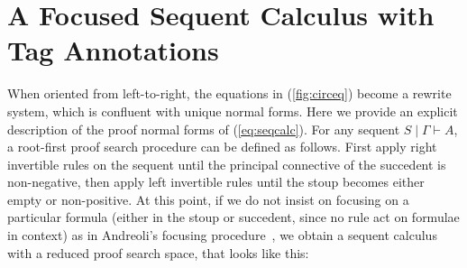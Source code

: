 \documentclass[submission,copyright,creativecommons]{eptcs}
\theoremstyle{definition}
\begin{document}
\section{A Focused Sequent Calculus with Tag Annotations}\label{sec:focusing}
When oriented from left-to-right, the equations in (\ref{fig:circeq}) become a  rewrite system, which is confluent with unique normal forms. Here we provide an explicit description of the proof normal forms of (\ref{eq:seqcalc}).
For any sequent $S \mid \Gamma \vdash A$, a root-first proof search procedure can be defined as follows. First apply right invertible rules on the sequent until the principal connective of the succedent is non-negative, then apply left invertible rules until the stoup becomes either empty or non-positive. At this point, if we do not insist on focusing on a particular formula (either in the stoup or succedent, since no rule act on formulae in context) as in Andreoli's focusing procedure~\cite{andreoli:logic:1992}, we obtain a sequent calculus with a reduced proof search space, that looks like this:
\end{document}
